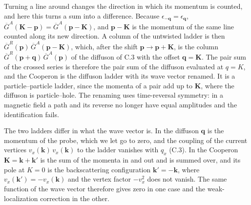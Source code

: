 Turning a line around changes the direction in which its momentum is counted, and here this turns a sum into a difference. Because $\epsilon_{-\mathbf q}=\epsilon_{\mathbf q}$, $\overline G^A(\mathbf K-\mathbf p)=\overline G^A(\mathbf p-\mathbf K)$, and $\mathbf p-\mathbf K$ is the momentum of the same line counted along its new direction. A column of the untwisted ladder is then $\overline G^R(\mathbf p)\,\overline G^A(\mathbf p-\mathbf K)$, which, after the shift $\mathbf p\to\mathbf p+\mathbf K$, is the column $\overline G^R(\mathbf p+\mathbf q)\,\overline G^A(\mathbf p)$ of the diffuson of C.3 with the offset $\mathbf q=\mathbf K$. The pair sum of the crossed series is therefore the pair sum of the diffuson evaluated at $q=K$, and the Cooperon is the diffuson ladder with its wave vector renamed. It is a particle--particle ladder, since the momenta of a pair add up to $\mathbf K$, where the diffuson is particle--hole. The renaming uses time-reversal symmetry: in a magnetic field a path and its reverse no longer have equal amplitudes and the identification fails.

The two ladders differ in what the wave vector is. In the diffuson $\mathbf q$ is the momentum of the probe, which we let go to zero, and the coupling of the current vertices $v_x(\mathbf k)\,v_x(\mathbf k)$ to the ladder vanishes with $q_x$ (C.3). In the Cooperon $\mathbf K=\mathbf k+\mathbf k'$ is the sum of the momenta in and out and is summed over, and its pole at $K=0$ is the backscattering configuration $\mathbf k'=-\mathbf k$, where $v_x(\mathbf k')=-v_x(\mathbf k)$ and the vertex factor $-v_x^2$ does not vanish. The same function of the wave vector therefore gives zero in one case and the weak-localization correction in the other.


